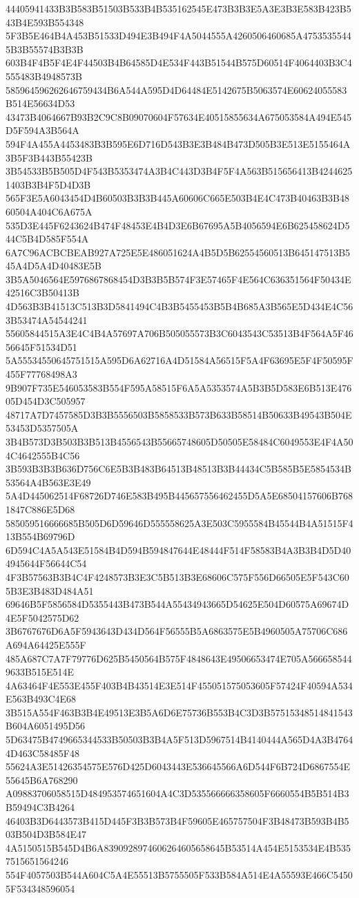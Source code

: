 {{{{{{{{{{{{{{{{{{{{{44405941433B3B583B51503B533B4B535162545E473B3B3E5A3E3B3E583B423B543B4E593B554348
5F3B5E464B4A453B51533D494E3B494F4A5044555A4260506460685A47535355445B3B55574B3B3B
603B4F4B5F4E4F44503B4B64585D4E534F443B51544B575D60514F4064403B3C4555483B4948573B
585964596262646759434B6A544A595D4D64484E5142675B5063574E60624055583B514E56634D53
43473B4064667B93B2C9C8B09070604F57634E40515855634A675053584A494E545D5F594A3B564A
594F4A455A4453483B3B595E6D716D543B3E3B484B473D505B3E513E5155464A3B5F3B443B55423B
3B54533B5B505D4F543B5353474A3B4C443D3B4F5F4A563B515656413B42446251403B3B4F5D4D3B
565F3E5A6043454D4B60503B3B3B445A60606C665E503B4E4C473B40463B3B4860504A404C6A675A
535D3E445F6243624B474F48453E4B4D3E6B67695A5B4056594E6B625458624D544C5B4D585F554A
6A7C96ACBCBEAB927A725E5E486051624A4B5D5B62554560513B645147513B545A4D5A4D40483E5B
3B5A5046564E5976867868454D3B3B5B574F3E57465F4E564C636351564F50434E42516C3B50413B
4D563B3B41513C513B3D5841494C4B3B5455453B5B4B685A3B565E5D434E4C563B53474A54544241
55605844515A3E4C4B4A57697A706B505055573B3C6043543C53513B4F564A5F4656645F51534D51
5A55534550645751515A595D6A62716A4D51584A56515F5A4F63695E5F4F50595F455F77768498A3
9B907F735E546053583B554F595A58515F6A5A5353574A5B3B5D583E6B513E47605D454D3C505957
48717A7D7457585D3B3B5556503B5858533B573B633B58514B50633B49543B504E53453D5357505A
3B4B573D3B503B3B513B4556543B55665748605D50505E58484C6049553E4F4A504C4642555B4C56
3B593B3B3B636D756C6E5B3B483B64513B48513B3B44434C5B585B5E5854534B53564A4B563E3E49
5A4D445062514F68726D746E583B495B445657556462455D5A5E68504157606B7681847C886E5D68
585059516666685B505D6D59646D555558625A3E503C5955584B45544B4A51515F413B554B69796D
6D594C4A5A543E51584B4D594B594847644E48444F514F58583B4A3B3B4D5D404945644F56644C54
4F3B57563B3B4C4F4248573B3E3C5B513B3E68606C575F556D66505E5F543C605B3E3B483D484A51
69646B5F5856584D5355443B473B544A55434943665D54625E504D60575A69674D4E5F5042575D62
3B6767676D6A5F5943643D434D564F56555B5A6863575E5B4960505A75706C686A694A64425E555F
485A687C7A7F79776D625B5450564B575F4848643E49506653474E705A5666585449633B515E514E
4A63464F4E553E455F403B4B43514E3E514F455051575053605F57424F40594A534E563B493C4E68
3B515A554F463B3B4E49513E3B5A6D6E75736B553B4C3D3B57515348514841543B604A6051495D56
5D63475B4749665344533B50503B3B4A5F513D5967514B4140444A565D4A3B47644D463C58485F48
55624A3E51426354575E576D425D6043443E536645566A6D544F6B724D6867554E55645B6A768290
A09883706058515D484953574651604A4C3D535566666358605F6660554B5B514B3B59494C3B4264
46403B3D6443573B415D445F3B3B573B4F59605E465757504F3B48473B593B4B503B504D3B584E47
4A5150515B545D4B6A8390928974606264605658645B53514A454E5153534E4B5357515651564246
554F4057503B544A604C5A4E55513B5755505F533B584A514E4A55593E466C54505F534348596054
}}}}}}}}}}}}}}}}}}}}}
